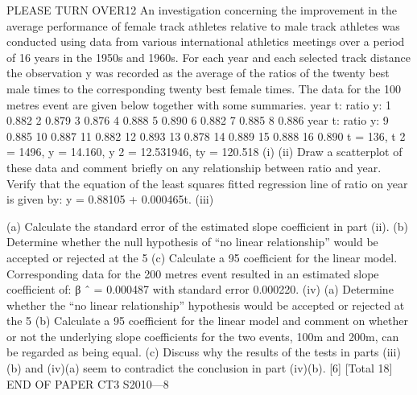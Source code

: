 \documentclass[a4paper,12pt]{article}
\begin{document}
\begin{enumerate}

PLEASE TURN OVER12
An investigation concerning the improvement in the average performance of female
track athletes relative to male track athletes was conducted using data from various
international athletics meetings over a period of 16 years in the 1950s and 1960s. For
each year and each selected track distance the observation y was recorded as the
average of the ratios of the twenty best male times to the corresponding twenty best
female times.
The data for the 100 metres event are given below together with some summaries.
year t:
ratio y: 1
0.882 2
0.879 3
0.876 4
0.888 5
0.890 6
0.882 7
0.885 8
0.886
year t:
ratio y: 9
0.885 10
0.887 11
0.882 12
0.893 13
0.878 14
0.889 15
0.888 16
0.890
\sigma t = 136, \sigma t 2 = 1496, \sigma y = 14.160, \sigma y 2 = 12.531946, \sigma ty = 120.518
(i)
(ii)
Draw a scatterplot of these data and comment briefly on any relationship
between ratio and year.
Verify that the equation of the least squares fitted regression line of ratio on
year is given by:
y = 0.88105 + 0.000465t.
(iii)


(a) Calculate the standard error of the estimated slope coefficient in part
(ii).
(b) Determine whether the null hypothesis of “no linear relationship”
would be accepted or rejected at the 5%
(c) Calculate a 95%
coefficient for the linear model.
Corresponding data for the 200 metres event resulted in an estimated slope coefficient
of:
β ˆ = 0.000487 with standard error 0.000220.
(iv)
(a) Determine whether the “no linear relationship” hypothesis would be
accepted or rejected at the 5%
(b) Calculate a 95%
coefficient for the linear model and comment on whether or not the
underlying slope coefficients for the two events, 100m and 200m, can
be regarded as being equal.
(c) Discuss why the results of the tests in parts (iii)(b) and (iv)(a) seem to
contradict the conclusion in part (iv)(b).
[6]
[Total 18]
END OF PAPER
CT3 S2010—8








\end{enumerate}
\end{document}
